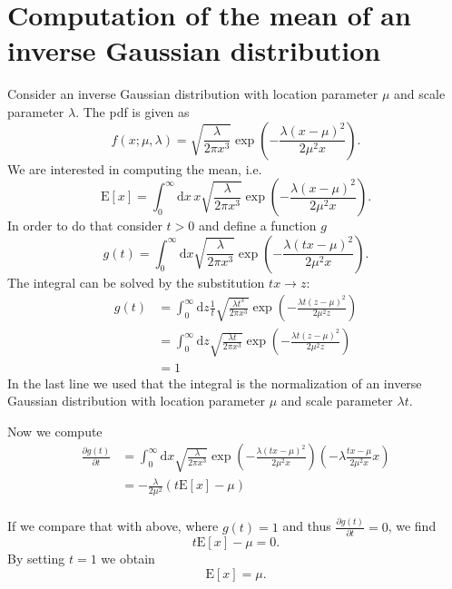\documentclass{scrreprt}
\renewcommand{\d}{{\mathrm{d}}}
\begin{document}
\chapter*{Computation of the mean of an inverse Gaussian distribution}
Consider an inverse Gaussian distribution with location parameter $\mu$ and scale parameter $\lambda$. The pdf is given as
\begin{equation*}
 f(x;\mu ,\lambda )= \sqrt{\frac{\lambda }{2\pi x^{3}}} \exp \left(- \frac{\lambda (x-\mu )^{2}}{2\mu ^{2}x} \right).
\end{equation*}
We are interested in computing the mean, i.e.
\begin{equation*}
\mathrm{E}[x] = \int_{0}^{\infty}\d x\,x\sqrt{\frac{\lambda }{2\pi x^{3}}} \exp \left(- \frac{\lambda (x-\mu )^{2}}{2\mu ^{2}x} \right).
\end{equation*}
In order to do that consider $t > 0$ and define a function $g$
\begin{equation*}
g(t) = \int_{0}^{\infty}\d x\sqrt{\frac{\lambda }{2\pi x^{3}}} \exp \left( -\frac{\lambda (tx-\mu )^{2}}{2\mu ^{2}x} \right).
\end{equation*}
The integral can be solved by the substitution $tx \rightarrow z$:
\begin{align*}
g(t)&=\int_{0}^{\infty}\d z\frac{1}{t}\sqrt{\frac{\lambda t^3}{2\pi x^{3}}} \exp \left(- \frac{\lambda t(z-\mu )^{2}}{2\mu ^{2}z} \right)\\
&=\int_{0}^{\infty}\d z\sqrt{\frac{\lambda t}{2\pi x^{3}}} \exp \left( -\frac{\lambda t(z-\mu )^{2}}{2\mu ^{2}z} \right)\\
&=1
\end{align*}
In the last line we used that the integral is the normalization of an inverse Gaussian distribution with location parameter $\mu$ and scale parameter $\lambda t$.

Now we compute 
\begin{align*}
\frac{\partial g(t)}{\partial t}&=\int_{0}^{\infty}\d x\sqrt{\frac{\lambda }{2\pi x^{3}}} \exp \left(- \frac{\lambda (tx-\mu )^{2}}{2\mu ^{2}x} \right)\left(- \lambda\frac{tx-\mu}{2 \mu^2 x}x\right)\\
&=-\frac{\lambda}{2 \mu^2}\left(t\mathrm{E}[x]-\mu\right)\\
\end{align*}

If we compare that with above, where $g(t) = 1 $ and thus  $\frac{\partial g(t)}{\partial t}=0$, we find
\begin{equation*}
t\mathrm{E}[x]-\mu = 0.
\end{equation*}
By setting $t = 1$ we obtain
\begin{equation*}
\mathrm{E}[x] = \mu.
\end{equation*}
\end{document}
